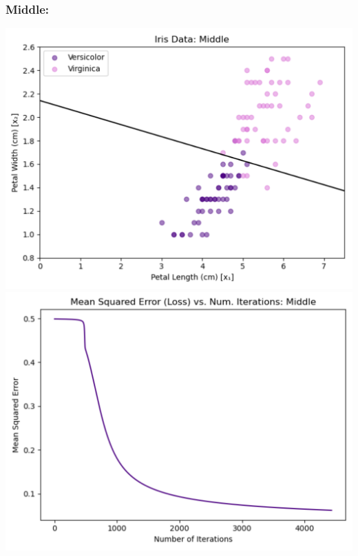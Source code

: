 \documentclass{article} %
\begin{document}
\subsubsection*{Middle: }
\begin{center}
    \includegraphics[scale = 0.388]{just_another_screenshot.png} \includegraphics[scale = 0.35]{3c_plot_middle_loss.png}
\end{center}
\end{document}
